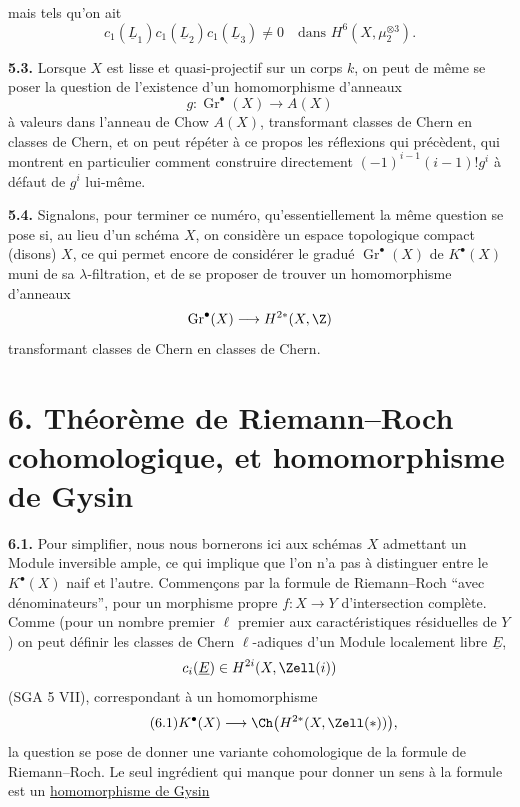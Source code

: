 
mais tels qu'on ait
\[
 c_1(\underline{L}_1)c_1(\underline{L}_2)c_1(\underline{L}_3)\ne0
 \quad\text{dans }H^6(X,\mu_2^{\otimes3}).
\]

\textbf{5.3.} Lorsque $X$ est lisse et quasi-projectif sur un corps $k$, on peut de même se poser la question de l'existence d'un homomorphisme d'anneaux
\[
 g:\operatorname{Gr}^\bullet(X)\longrightarrow A(X)
\]
à valeurs dans l'anneau de Chow $A(X)$, transformant classes de Chern en classes de Chern, et on peut répéter à ce propos les réflexions qui précèdent, qui montrent en particulier comment construire directement $(-1)^{i-1}(i-1)!g^i$ à défaut de $g^i$ lui-même.

\textbf{5.4.} Signalons, pour terminer ce numéro, qu'essentiellement la même question se pose si, au lieu d'un schéma $X$, on considère un espace topologique compact (disons) $X$, ce qui permet encore de considérer le gradué $\operatorname{Gr}^\bullet(X)$ de $K^\bullet(X)$ muni de sa $\lambda$-filtration, et de se proposer de trouver un homomorphisme d'anneaux
\[
 \operatorname{Gr}^\bullet(X)\longrightarrow H^{2*}(X,\Z)
\]
transformant classes de Chern en classes de Chern.

\section*{6. Théorème de Riemann--Roch cohomologique, et homomorphisme de Gysin}

\textbf{6.1.} Pour simplifier, nous nous bornerons ici aux schémas $X$ admettant un Module inversible ample, ce qui implique que l'on n'a pas à distinguer entre le $K^\bullet(X)$ naif et l'autre. Commençons par la formule de Riemann--Roch ``avec dénominateurs'', pour un morphisme propre $f:X\to Y$ d'intersection complète. Comme (pour un nombre premier $\ell$ premier aux caractéristiques résiduelles de $Y$) on peut définir les classes de Chern $\ell$-adiques d'un Module localement libre $\underline{E}$,
\[
 c_i(\underline{E})\in H^{2i}(X,\Zell(i))
\]
(SGA 5 VII), correspondant à un homomorphisme
\begin{equation}\tag{6.1}
 K^\bullet(X)\longrightarrow \Ch\bigl(H^{2*}(X,\Zell(*))\bigr),
\end{equation}
la question se pose de donner une variante cohomologique de la formule de Riemann--Roch. Le seul ingrédient qui manque pour donner un sens à la formule est un \uline{homomorphisme de Gysin}
